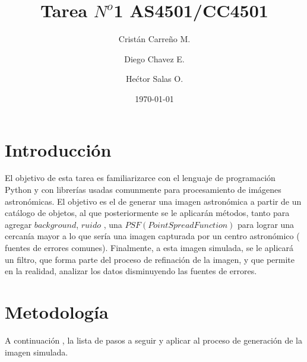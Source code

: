 \documentclass[twocolumn]{AS4201}
\begin{document}
%
\title{Tarea $N^o$1 AS4501/CC4501}
\author{Crist\'an Carre\~no M. \and
		Diego Chavez E. \and
		He\'ctor Salas O.\\ 
\inst{}
}
\date{\today}
\maketitle
%
\section{Introducción}
El objetivo de esta tarea es familiarizarce con el lenguaje de programación Python y con librerías usadas comunmente para procesamiento de imágenes astronómicas. El objetivo es el de generar una imagen astronómica a partir de un catálogo de objetos, al que posteriormente se le aplicarán métodos, tanto para agregar $background$, $ruido$ , una $PSF(Point Spread Function)$ para lograr una cercanía mayor a lo que sería una imagen capturada por un centro astronómico ( fuentes de errores comunes). Finalmente, a esta imagen simulada, se le aplicará un filtro, que forma parte del proceso de refinación de la imagen, y que permite en la realidad, analizar los datos disminuyendo las fuentes de errores.

\section{Metodología} 
A continuación , la lista de pasos a seguir y aplicar al proceso de generación de la imagen simulada.
\end{document}
